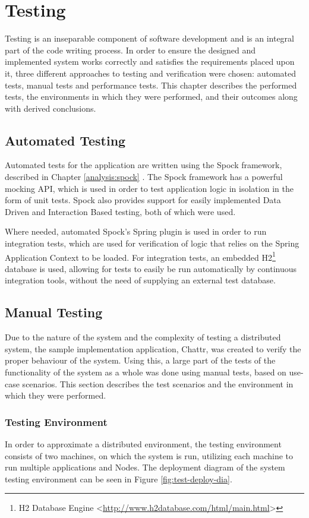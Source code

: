 \chapter{Testing}

Testing is an inseparable component of software development and is an integral part of the code writing process. In order to ensure the designed and implemented system works correctly and satisfies the requirements placed upon it, three different approaches to testing and verification were chosen: automated tests, manual tests and performance tests. This chapter describes the performed tests, the environments in which they were performed, and their outcomes along with derived conclusions.

\section{Automated Testing}
Automated tests for the application are written using the Spock framework, described in Chapter \ref{analysis:spock} . The Spock framework has a powerful mocking API, which is used in order to test application logic in isolation in the form of unit tests. Spock also provides support for easily implemented Data Driven and Interaction Based testing, both of which were used.

Where needed, automated Spock's Spring plugin is used in order to run integration tests, which are used for verification of logic that relies on the Spring Application Context to be loaded. For integration tests, an embedded H2\footnote{H2 Database Engine <\url{http://www.h2database.com/html/main.html}>} database is used, allowing for tests to easily be run automatically by continuous integration tools, without the need of supplying an external test database.

\section{Manual Testing}
Due to the nature of the system and the complexity of testing a distributed system, the sample implementation application, Chattr, was created to verify the proper behaviour of the system. Using this, a large part of the tests of the functionality of the system as a whole was done using manual tests, based on use-case scenarios. This section describes the test scenarios and the environment in which they were performed.

\subsection{Testing Environment} \label{test:test-env}
In order to approximate a distributed environment, the testing environment consists of two machines, on which the system is run, utilizing each machine to run multiple applications and Nodes. The deployment diagram of the system testing environment can be seen in Figure \ref{fig:test-deploy-dia}.

